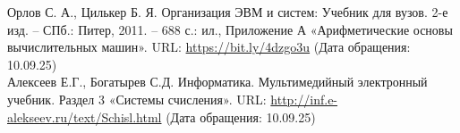 \begin{thebibliography}{}
    Орлов С. А., Цилькер Б. Я. Организация ЭВМ и систем: Учебник для вузов. 2-е изд. – СПб.: Питер, 2011. – 688 с.: ил., Приложение А «Арифметические основы вычислительных машин». URL: \url{https://bit.ly/4dzgo3u} (Дата обращения: 10.09.25) \\
    Алексеев Е.Г., Богатырев С.Д. Информатика. Мультимедийный электронный учебник. Раздел 3 «Системы счисления». URL: \url{http://inf.e-alekseev.ru/text/Schisl.html} (Дата обращения: 10.09.25)
\end{thebibliography}